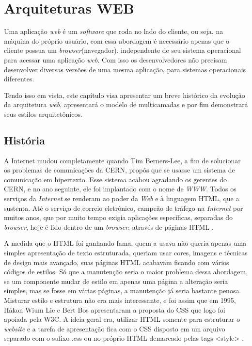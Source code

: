 
\chapter{Arquiteturas  WEB}
\label{c_cap2}

Uma aplicação \textit{web} é um \textit{software} que roda no lado do cliente, ou seja, na máquina do próprio usuário, com essa abordagem é necessário  apenas que o cliente possua um \textit{browser}(navegador), independente de seu sistema operacional para acessar uma aplicação \textit{web}. Com isso os desenvolvedores não precisam desenvolver diversas versões de uma mesma aplicação, para sistemas operacionais diferentes.

Tendo isso em vista, este capítulo visa apresentar um breve histórico da evolução da arquitetura  \textit{web}, apresentará o modelo de multicamadas e por fim demonstrará seus estilos arquitetônicos.

\section{História}


A Internet mudou completamente quando Tim Berners-Lee, a fim de solucionar os problemas de comunicações da \ac{CERN}, propôs que se usasse um sistema de comunicação em hipertexto. Esse sistema acabou agradando os gerentes do \ac{CERN}, e no ano seguinte, ele foi implantado com o nome de \textit{\ac{WWW}}. Todos os serviços da \textit{Internet} se renderam ao poder da \textit{Web} e à linguagem \ac{HTML}, que a sustenta. Até o serviço de correio eletrônico, campeão de tráfego na \textit{Internet} por muitos anos, que por muito tempo exigia aplicações específicas, separadas do \textit{browser}, hoje é lido dentro de um \textit{browser}, através de páginas \ac{HTML} \cite{rocha99}. 

A medida que o \ac{HTML} foi ganhando fama, quem a usava não queria apenas uma simples apresentação de texto estruturada, queriam usar cores, imagens e técnicas de design mais avançado, suas páginas \ac{HTML} acabavam ficando com vários códigos de estilos. Só que a manutenção seria o maior problema dessa abordagem, se um componente mudar de estilo em apenas uma página a alteração seria simples, mas se fosse em várias páginas, a manutenção já seria bastante penosa. Misturar estilo e estrutura não era mais interessante, e foi assim que em 1995, Håkon Wium Lie e Bert Bos apresentaram a proposta do \ac{CSS} que logo foi apoiada pela \ac{W3C}. A ideia geral era, utilizar \ac{HTML} somente para estruturar o \textit{website} e a tarefa de apresentação fica com o \ac{CSS} disposto em um arquivo separado com o sufixo .css ou no próprio \ac{HTML} demarcado pelas tags <style> \cite{devmediaCSS2018}.

